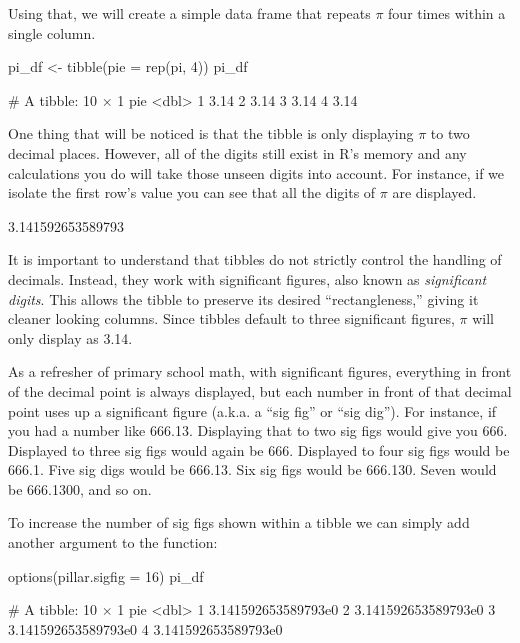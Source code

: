 \noindent
Using that, we will create a simple data frame that repeats $\pi$ four times within a single column.

\begin{inR}
pi_df <- tibble(pie = rep(pi, 4))
pi_df
\end{inR}
\begin{outR}
# A tibble: 10 × 1
     pie
   <dbl>
 1  3.14
 2  3.14
 3  3.14
 4  3.14
\end{outR}

\noindent
One thing that will be noticed is that the tibble is only displaying $\pi$ to two decimal places. However, all of the digits still exist in R's memory and any calculations you do will take those unseen digits into account. For instance, if we isolate the first row's value you can see that all the digits of $\pi$ are displayed.

\begin{outR}
[1] 3.141592653589793
\end{outR}

\noindent
It is important to understand that tibbles do not strictly control the handling of decimals. Instead, they work with \gls{significant figures}, also known as \textit{significant digits}.  This allows the tibble to preserve its desired ``rectangleness,'' giving it cleaner looking columns. Since tibbles default to three significant figures, $\pi$ will only display as 3.14. 

As a refresher of primary school math, with significant figures, everything in front of the decimal point is always displayed, but each number in front of that decimal point uses up a significant figure (a.k.a. a ``sig fig'' or ``sig dig''). For instance, if you had a number like 666.13.  Displaying that to two sig figs would give you 666.  Displayed to three sig figs would again be 666. Displayed to four sig figs would be 666.1. Five sig digs would be 666.13. Six sig figs would be 666.130. Seven would be 666.1300, and so on.

To increase the number of sig figs shown within a tibble we can simply add another argument to the  function:

\begin{inR}
options(pillar.sigfig = 16)
pi_df
\end{inR}
\begin{outR}
# A tibble: 10 × 1
                   pie
                 <dbl>
 1 3.141592653589793e0
 2 3.141592653589793e0
 3 3.141592653589793e0
 4 3.141592653589793e0
\end{outR}

